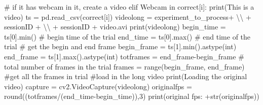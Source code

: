\documentclass[
  letterpaper,
  DIV=11,
  numbers=noendperiod]{scrreprt}
\newenvironment{Shaded}{\begin{snugshade}}{\end{snugshade}}
\newcommand{\BuiltInTok}[1]{\textcolor[rgb]{0.00,0.23,0.31}{#1}}
\newcommand{\CharTok}[1]{\textcolor[rgb]{0.13,0.47,0.30}{#1}}
\newcommand{\CommentTok}[1]{\textcolor[rgb]{0.37,0.37,0.37}{#1}}
\newcommand{\ControlFlowTok}[1]{\textcolor[rgb]{0.00,0.23,0.31}{#1}}
\newcommand{\DecValTok}[1]{\textcolor[rgb]{0.68,0.00,0.00}{#1}}
\newcommand{\KeywordTok}[1]{\textcolor[rgb]{0.00,0.23,0.31}{#1}}
\newcommand{\NormalTok}[1]{\textcolor[rgb]{0.00,0.23,0.31}{#1}}
\newcommand{\OperatorTok}[1]{\textcolor[rgb]{0.37,0.37,0.37}{#1}}
\newcommand{\StringTok}[1]{\textcolor[rgb]{0.13,0.47,0.30}{#1}}
\begin{document}
\begin{Shaded}
\begin{Highlighting}[]
        \CommentTok{\# if it has webcam in it, create a video}
        \ControlFlowTok{elif} \StringTok{\textquotesingle{}Webcam\textquotesingle{}} \KeywordTok{in}\NormalTok{ correct[i]:}
            \BuiltInTok{print}\NormalTok{(}\StringTok{\textquotesingle{}This is a video\textquotesingle{}}\NormalTok{)}
\NormalTok{            ts }\OperatorTok{=}\NormalTok{ pd.read\_csv(correct[i])}
\NormalTok{            videolong }\OperatorTok{=}\NormalTok{ experiment\_to\_process}\OperatorTok{+} \StringTok{\textquotesingle{}}\CharTok{\textbackslash{}\textbackslash{}}\StringTok{\textquotesingle{}} \OperatorTok{+}\NormalTok{ sessionID }\OperatorTok{+} \StringTok{\textquotesingle{}}\CharTok{\textbackslash{}\textbackslash{}}\StringTok{\textquotesingle{}} \OperatorTok{+}\NormalTok{ sessionID }\OperatorTok{+} \StringTok{\textquotesingle{}{-}video.avi\textquotesingle{}}
            \BuiltInTok{print}\NormalTok{(videolong)}
\NormalTok{            begin\_time }\OperatorTok{=}\NormalTok{ ts[}\StringTok{\textquotesingle{}0\textquotesingle{}}\NormalTok{].}\BuiltInTok{min}\NormalTok{() }\CommentTok{\# begin time of the trial}
\NormalTok{            end\_time }\OperatorTok{=}\NormalTok{ ts[}\StringTok{\textquotesingle{}0\textquotesingle{}}\NormalTok{].}\BuiltInTok{max}\NormalTok{() }\CommentTok{\# end time of the trial}
            \CommentTok{\# get the begin and end frame}
\NormalTok{            begin\_frame }\OperatorTok{=}\NormalTok{ ts[}\StringTok{\textquotesingle{}1\textquotesingle{}}\NormalTok{].}\BuiltInTok{min}\NormalTok{().astype(}\BuiltInTok{int}\NormalTok{)}
\NormalTok{            end\_frame }\OperatorTok{=}\NormalTok{ ts[}\StringTok{\textquotesingle{}1\textquotesingle{}}\NormalTok{].}\BuiltInTok{max}\NormalTok{().astype(}\BuiltInTok{int}\NormalTok{)}
\NormalTok{            totframes }\OperatorTok{=}\NormalTok{ end\_frame}\OperatorTok{{-}}\NormalTok{begin\_frame }\CommentTok{\# total number of frames in the trial}
\NormalTok{            frames }\OperatorTok{=} \BuiltInTok{range}\NormalTok{(begin\_frame, end\_frame) }\CommentTok{\#get all the frames in trial}
            \CommentTok{\#load in the long video}
            \BuiltInTok{print}\NormalTok{(}\StringTok{\textquotesingle{}Loading the original video\textquotesingle{}}\NormalTok{)}
\NormalTok{            capture }\OperatorTok{=}\NormalTok{ cv2.VideoCapture(videolong) }
\NormalTok{            originalfps }\OperatorTok{=} \BuiltInTok{round}\NormalTok{((totframes}\OperatorTok{/}\NormalTok{(end\_time}\OperatorTok{{-}}\NormalTok{begin\_time)),}\DecValTok{3}\NormalTok{)}
            \BuiltInTok{print}\NormalTok{(}\StringTok{\textquotesingle{}original fps: \textquotesingle{}}\OperatorTok{+}\BuiltInTok{str}\NormalTok{(originalfps))}
            

\end{Highlighting}
\end{Shaded}
\end{document}
